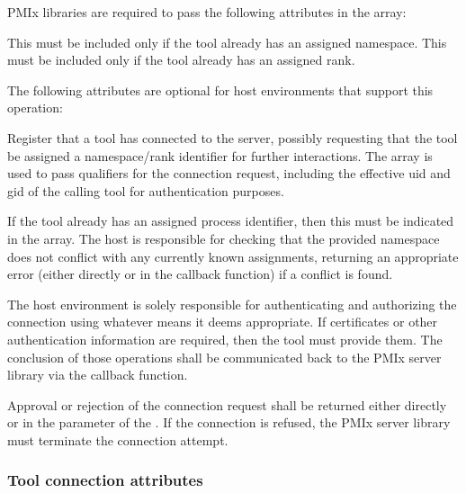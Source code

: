 \reqattrstart
\ac{PMIx} libraries are required to pass the following attributes in the  array:

This must be included only if the tool already has an assigned namespace.
\pasteAttributeItemEnd{}
This must be included only if the tool already has an assigned rank.
\pasteAttributeItemEnd{}

\reqattrend


\optattrstart
The following attributes are optional for host environments that support this operation:


\optattrend

\descr

Register that a tool has connected to the server, possibly requesting that the
tool be assigned a namespace/rank identifier for further interactions.
The  array is used to pass qualifiers for the
connection request, including the effective uid and gid of the calling tool
for authentication purposes.

If the tool already has an assigned process identifier, then this must be
indicated in the  array. The host is responsible for checking
that the provided namespace does not conflict with any currently known
assignments, returning an appropriate error (either directly or in the
callback function) if a conflict is found.

The host environment is solely responsible for authenticating and authorizing
the connection using whatever means it deems appropriate. If certificates or
other authentication information are required, then the tool must provide them.
The conclusion of those operations shall be communicated back to the \ac{PMIx}
server library via the callback function.

Approval or rejection of the connection request shall be returned either directly
or in the
 parameter of the . If
the connection is refused, the \ac{PMIx} server library must terminate the
connection attempt.

\subsubsection{Tool connection attributes}

